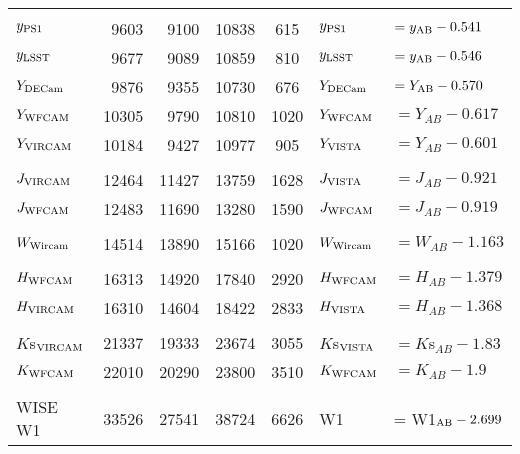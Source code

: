 \documentclass[usenatbib]{mnras}
\begin{document}
\begin{table*}
\begin{center}
\begin{tabular}{l r r r  c l l}
      &&&&&&\\
      $y_{\rm PS1}$      &       9603    &	 9100    &    10838  &     615       &  $y_{\rm PS1}    $       &$   = y_{\rm AB} -  0.541 $ \\
      $y_{\rm LSST}$      &      9677   &	 9089    &    10859  &     810         &  $y_{\rm LSST}  $      &$    = y_{\rm AB} - 0.546 $ \\
      $Y_{\rm DECam}$   &      9876   &	  9355    &      10730   &    676      &  $Y_{\rm DECam}  $   &$  =Y_{\rm AB} - 0.570 $ \\
      $Y_{\rm WFCAM}$    &   10305    &   9790      &   10810   &   1020     & $Y_{\rm WFCAM}$     &$ =  Y_{AB}  - 0.617$           \\
      $Y_{\rm VIRCAM}$     &    10184    &   9427      &   10977   &    905        & $Y_{\rm VISTA} $     &$ = Y_{AB}  - 0.601 $          \\
      &&&&&&\\
      $J_{\rm VIRCAM} $     &   12464   &      11427   &    13759   &  1628     &  $J_{\rm VISTA}  $     & $= J_{AB}    - 0.921  $         \\
      $J_{\rm WFCAM} $    &    12483   &     11690  &    13280   &   1590      & $J_{\rm WFCAM}$     & $= J_{AB}    - 0.919 $          \\
      &&&&&&\\
      $W_{\rm Wircam}$   &    14514    &    13890   &    15166   &   1020    & $W_{\rm Wircam} $    & $= W_{AB}  -  1.163$           \\
      &&&&&&\\
      $H_{\rm WFCAM}$    &    16313     &    14920  &    17840   &   2920    & $H_{\rm WFCAM} $   & $= H_{AB}  - 1.379$          \\
      $H_{\rm VIRCAM}$      &    16310    &    14604   &    18422   &   2833     & $H_{\rm VISTA}$      & $= H_{AB}  - 1.368 $        \\
      &&&&&&\\
      $K$s$_{\rm VIRCAM}$     &    21337    &    19333  &    23674   &   3055     & $K$s$_{\rm VISTA}$      & $ = K$s$_{AB} - 1.83  $          \\ 
      $K_{\rm WFCAM}$     &    22010     &    20290 &    23800   &   3510     & $K_{\rm WFCAM}$     & $ = K_{AB} - 1.9  $          \\ 
      &&&&&&\\
      WISE W1               &    33526    &    27541  &    38724   &    6626    & W1                        &   = W1$_{\rm AB} - 2.699$ \\

\end{tabular}
\end{center}
\end{table*}
\end{document}
